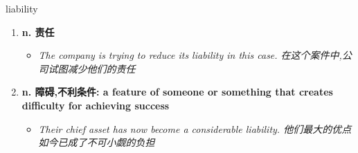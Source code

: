 
\begin{frame}
{\huge liability}
\begin{center}
\begin{enumerate}\Large
  \item \textbf{n. 责任}
  \begin{itemize}
    \item \em{\Large{The company is trying to reduce its liability in this case. 在这个案件中,公司试图减少他们的责任}}
  \end{itemize}
  \item \textbf{n. 障碍,不利条件: a feature of someone or something that creates difficulty for achieving success}
  \begin{itemize}
    \item \em{\Large{Their chief asset has now become a considerable liability. 他们最大的优点如今已成了不可小觑的负担}}
  \end{itemize}
\end{enumerate}
\end{center}
\end{frame}
